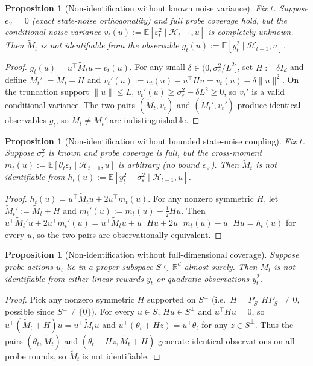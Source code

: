 \documentclass{article}
\newcommand{\R}{\mathbb{R}}
\newcommand{\E}{\mathbb{E}}
\newcommand{\cH}{\mathcal{H}}
\newtheorem{proposition}[theorem]{Proposition}
\begin{document}
\begin{proposition}[Non-identification without known noise variance]
\label{prop:nonid_a}
Fix $t$. Suppose $\epsilon_\times=0$ (exact state-noise orthogonality)
and full probe coverage hold, but the conditional noise variance
$v_t(u):=\E[\varepsilon_t^2\mid\cH_{t-1},u]$ is completely unknown.
Then $\widetilde M_t$ is not identifiable from the observable
$g_t(u):=\E[y_t^2\mid\cH_{t-1},u]$.
\end{proposition}
\begin{proof}
$g_t(u) = u^\top\widetilde M_t u + v_t(u)$. For any small
$\delta\in(0,\sigma_\varepsilon^2/L^2]$, set $H:=\delta I_d$ and
define $\widetilde M_t':=\widetilde M_t + H$ and
$v_t'(u):=v_t(u) - u^\top H u = v_t(u)-\delta\|u\|^2$. On the
truncation support $\|u\|\le L$, $v_t'(u)\ge \sigma_\varepsilon^2 -
\delta L^2\ge 0$, so $v_t'$ is a valid conditional variance. The two
pairs $(\widetilde M_t,v_t)$ and $(\widetilde M_t',v_t')$ produce
identical observables $g_t$, so $\widetilde M_t\ne\widetilde M_t'$
are indistinguishable.
\end{proof}

\begin{proposition}[Non-identification without bounded state-noise coupling]
\label{prop:nonid_b}
Fix $t$. Suppose $\sigma_\varepsilon^2$ is known and probe coverage is
full, but the cross-moment
$m_t(u):=\E[\theta_t\varepsilon_t\mid\cH_{t-1},u]$ is arbitrary (no
bound $\epsilon_\times$). Then $\widetilde M_t$ is not identifiable
from $h_t(u):=\E[y_t^2-\sigma_\varepsilon^2\mid\cH_{t-1},u]$.
\end{proposition}
\begin{proof}
$h_t(u) = u^\top\widetilde M_t u + 2 u^\top m_t(u)$. For any nonzero
symmetric $H$, let $\widetilde M_t':=\widetilde M_t + H$ and
$m_t'(u):=m_t(u) - \tfrac{1}{2}Hu$. Then
$u^\top\widetilde M_t' u + 2 u^\top m_t'(u)
= u^\top\widetilde M_t u + u^\top H u + 2 u^\top m_t(u) - u^\top H u
= h_t(u)$ for every $u$, so the two pairs are observationally
equivalent.
\end{proof}

\begin{proposition}[Non-identification without full-dimensional coverage]
\label{prop:nonid_c}
Suppose probe actions $u_t$ lie in a proper subspace $S\subsetneq\R^d$
almost surely. Then $\widetilde M_t$ is not identifiable from either
linear rewards $y_t$ or quadratic observations $y_t^2$.
\end{proposition}
\begin{proof}
Pick any nonzero symmetric $H$ supported on $S^\perp$ (i.e.\
$H = P_{S^\perp} H P_{S^\perp}\ne 0$, possible since
$S^\perp\ne\{0\}$). For every $u\in S$, $Hu\in S^\perp$ and $u^\top H u=0$,
so $u^\top(\widetilde M_t + H)u = u^\top\widetilde M_t u$ and
$u^\top(\theta_t + Hz)=u^\top\theta_t$ for any $z\in S^\perp$. Thus the
pairs $(\theta_t,\widetilde M_t)$ and $(\theta_t+Hz,\widetilde M_t+H)$
generate identical observations on all probe rounds, so $\widetilde M_t$
is not identifiable.
\end{proof}
\end{document}
